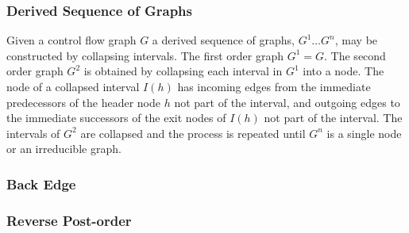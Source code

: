 
\subsubsection{Derived Sequence of Graphs}

Given a control flow graph $G$ a derived sequence of graphs, $G^1 \dots G^n$, may be constructed by collapsing intervals. The first order graph $G^1 = G$. The second order graph $G^2$ is obtained by collapsing each interval in $G^1$ into a node. The node of a collapsed interval $I(h)$ has incoming edges from the immediate predecessors of the header node $h$ not part of the interval, and outgoing edges to the immediate successors of the exit nodes of $I(h)$ not part of the interval. The intervals of $G^2$ are collapsed and the process is repeated until $G^n$ is a single node or an irreducible graph.



\subsubsection{Back Edge}



\subsubsection{Reverse Post-order}

